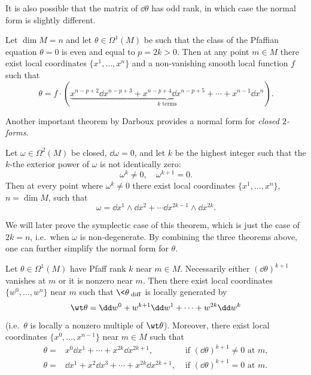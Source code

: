 It is also possible that the matrix of $\dd\theta$ has odd rank, in which case the normal form is slightly different.

\begin{thm}
    Let $\dim M=n$ and let $\theta\in\Omega^1(M)$ be such that the class of the Pfaffian equation $\theta=0$ is even and equal to $p=2k>0$. Then at any point $m\in M$ there exist local coordinates $\{x^1,\ldots,x^n\}$ and a non-vanishing smooth local function $f$ such that 
    \[\theta=f\cdot (\underbrace{x^{n-p+2}\dd x^{n-p+3}+x^{n-p+4}\dd x^{n-p+5}+\cdots +x^{n-1}\dd x^n}_{k\text{ terms}}).\]
\end{thm}

Another important theorem by Darboux provides a normal form for \emph{closed $2$-forms}.

\begin{thm}[Darboux]
    Let $\omega\in\Omega^2(M)$ be closed, $\dd\omega=0$, and let $k$ be the highest integer such that the $k$-the exterior power of $\omega$ is not identically zero:
    \[\omega^k\neq 0,\quad \omega^{k+1}=0.\]
    Then at every point where $\omega^k\neq 0$ there exist local coordinates $\{x^1,\ldots,x^n\}$, $n=\dim M$, such that 
    \[\omega=\dd x^1\wedge \dd x^2+\cdots \dd x^{2k-1}\wedge\dd x^{2k}.\]
\end{thm}

We will later prove the symplectic case of this theorem, which is just the case of $2k=n$, i.e.\ when $\omega$ is non-degenerate. By combining the three theorems above, one can further simplify the normal form for $\theta$.

\begin{thm}[Darboux]
    Let $\theta\in\Omega^1(M)$ have Pfaff rank $k$ near $m\in M$. Necessarily either $(\dd\theta)^{k+1}$ vanishes at $m$ or it is nonzero near $m$. Then there exist local coordinates $\{w^0,\ldots,w^n\}$ near $m$ such that $\<\theta\>_{\mathrm{diff}}$ is locally generated by 
    \[\wt\theta=\dd w^0+w^{k+1}\dd w^1+\cdots +w^{2k}\dd w^k\]
    (i.e.\ $\theta$ is locally a nonzero multiple of $\wt\theta$). Moreover, there exist local coordinates $\{x^0,\ldots,x^{n-1}\}$ near $m\in M$ such that
    \begin{align}
        \theta=& x^0 \dd x^1+\cdots +x^{2k}\dd x^{2k+1}, &\text{ if }(\dd\theta)^{k+1}\neq 0\text{ at }m,\\
        \theta=& \dd x^1+ x^2\dd x^3+\cdots +x^{2k} \dd x^{2k+1}, &\text{ if }(\dd\theta)^{k+1}=0 \text{ at }m.
    \end{align}
\end{thm}

